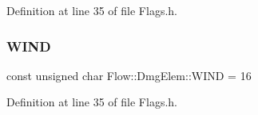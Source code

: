 Definition at line 35 of file Flags.\+h.

\hypertarget{namespace_flow_1_1_dmg_elem_ab161888a4cffbc8799e450085f9411b9}{}\label{namespace_flow_1_1_dmg_elem_ab161888a4cffbc8799e450085f9411b9} 
\subsubsection{\texorpdfstring{W\+I\+ND}{WIND}}
{\footnotesize\ttfamily const unsigned char Flow\+::\+Dmg\+Elem\+::\+W\+I\+ND = 16}



Definition at line 35 of file Flags.\+h.

